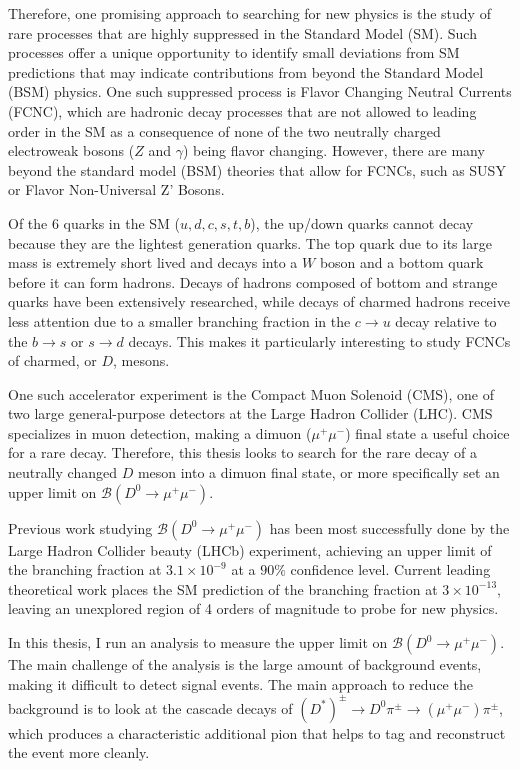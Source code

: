 Therefore, one promising approach to searching for new physics is the study of rare processes that are highly suppressed in the Standard Model (SM). Such processes offer a unique opportunity to identify small deviations from SM predictions that may indicate contributions from beyond the Standard Model (BSM) physics. One such suppressed process is Flavor Changing Neutral Currents (FCNC), which are hadronic decay processes that are not allowed to leading order in the SM as a consequence of none of the two neutrally charged electroweak bosons ($Z$ and $\gamma$) being flavor changing. However, there are many beyond the standard model (BSM) theories that allow for FCNCs, such as SUSY or Flavor Non-Universal Z' Bosons.

Of the 6 quarks in the SM ($u,d,c,s,t,b$), the up/down quarks cannot decay because they are the lightest generation quarks. The top quark due to its large mass is extremely short lived and decays into a $W$ boson and a bottom quark before it can form hadrons. Decays of hadrons composed of bottom and strange quarks have been extensively researched, while decays of charmed hadrons receive less attention due to a smaller branching fraction in the $c \to u$ decay relative to the $b\to s$ or $s \to d$ decays. This makes it particularly interesting to study FCNCs of charmed, or $D$, mesons.

One such accelerator experiment is the Compact Muon Solenoid (CMS), one of two large general-purpose detectors at the Large Hadron Collider (LHC). CMS specializes in muon detection, making a dimuon ($\mu^+\mu^-$) final state a useful choice for a rare decay. Therefore, this thesis looks to search for the rare decay of a neutrally changed $D$ meson into a dimuon final state, or more specifically set an upper limit on $\mathcal{B}(D^0 \to \mu^+ \mu^-)$.

Previous work studying $\mathcal{B}(D^0 \to \mu^+ \mu^-)$ has been most successfully done by the Large Hadron Collider beauty (LHCb) experiment, achieving an upper limit of the branching fraction at $3.1\times 10^{-9}$ at a $90\%$ confidence level. Current leading theoretical work places the SM prediction of the branching fraction at $3\times 10^{-13}$, leaving an unexplored region of 4 orders of magnitude to probe for new physics.

In this thesis, I run an analysis to measure the upper limit on $\mathcal{B}(D^0 \to \mu^+ \mu^-)$. The main challenge of the analysis is the large amount of background events, making it difficult to detect signal events. The main approach to reduce the background is to look at the cascade decays of $(D^*)^\pm \to D^0 \pi^\pm \to (\mu^+ \mu^-) \pi^\pm$, which produces a characteristic additional pion that helps to tag and reconstruct the event more cleanly. 

